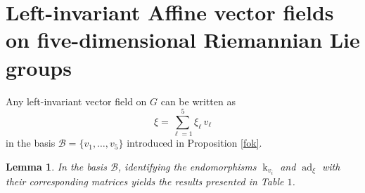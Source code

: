 \documentclass[10pt]{article}
\newtheorem{Lemma}{Lemma}
\begin{document}
\section{Left-invariant Affine  vector fields on five-dimensional Riemannian Lie groups}
Any left-invariant vector field on $G$ can be written as
\[
\xi = \sum_{\ell=1}^{5} \xi_\ell\,v_\ell
\]
in the basis $\mathcal{B} = \{v_1,\dots,v_5\}$ introduced in Proposition \ref{fok}.

\begin{Lemma}\label{Lem}
In the basis $\mathcal{B}$, identifying the endomorphisms $\operatorname{k}_{v_i}$ and $\operatorname{ad}_\xi$ with their corresponding matrices yields the results presented in Table $1$.

\begin{table}[ht]
\centering
\caption{Explicit full matrix forms of the operators 
 $\operatorname{ad}_\xi$ and $\operatorname{K}_{v_i}$ associated with $5$-dimensional Lie algebras.}
\footnotesize
{}
\end{table}
\end{Lemma}
\end{document}

